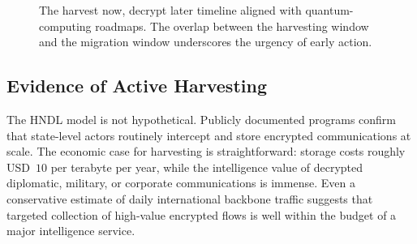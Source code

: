 \begin{figure}[t]
\centering
{}
\caption{The harvest now, decrypt later timeline aligned with quantum-computing roadmaps.  The overlap between the harvesting window and the migration window underscores the urgency of early action.}
\label{fig:ch01-hndl-timeline}
\end{figure}

\subsection{Evidence of Active Harvesting}

The HNDL model is not hypothetical.  Publicly documented programs confirm that state-level actors routinely intercept and store encrypted communications at scale.  The economic case for harvesting is straightforward: storage costs roughly USD~$10$ per terabyte per year, while the intelligence value of decrypted diplomatic, military, or corporate communications is immense.  Even a conservative estimate of daily international backbone traffic suggests that targeted collection of high-value encrypted flows is well within the budget of a major intelligence service.

